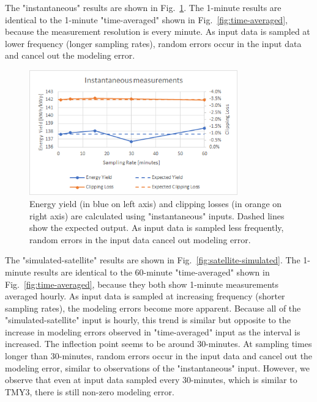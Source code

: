 \documentclass[conference]{IEEEtran}
\begin{document}
The "instantaneous" results are shown in Fig.~\ref{fig:instantaneous}. The 1-minute results are identical to the 1-minute "time-averaged" shown in Fig.~\ref{fig:time-averaged}, because the measurement resolution is every minute. As input data is sampled at lower frequency (longer sampling rates), random errors occur in the input data and cancel out the modeling error.

\begin{figure}[htbp]
\centerline{\includegraphics[width=9cm]{instantaneous.png}}
\caption{Energy yield (in blue on left axis) and clipping losses (in orange on right axis) are calculated using "instantaneous" inputs. Dashed lines show the expected output. As input data is sampled less frequently, random errors in the input data cancel out modeling error.}
\label{fig:instantaneous}
\end{figure}

The "simulated-satellite" results are shown in Fig.~\ref{fig:satellite-simulated}. The 1-minute results are identical to the 60-minute "time-averaged" shown in Fig.~\ref{fig:time-averaged}, because they both show 1-minute measurements averaged hourly. As input data is sampled at increasing frequency (shorter sampling rates), the modeling errors become more apparent. Because all of the "simulated-satellite" input is hourly, this trend is similar but opposite to the increase in modeling errors observed in "time-averaged" input as the interval is increased. The inflection point seems to be around 30-minutes. At sampling times longer than 30-minutes, random errors occur in the input data and cancel out the modeling error, similar to observations of the "instantaneous" input. However, we observe that even at input data sampled every 30-minutes, which is similar to TMY3, there is still non-zero modeling error.
\end{document}
